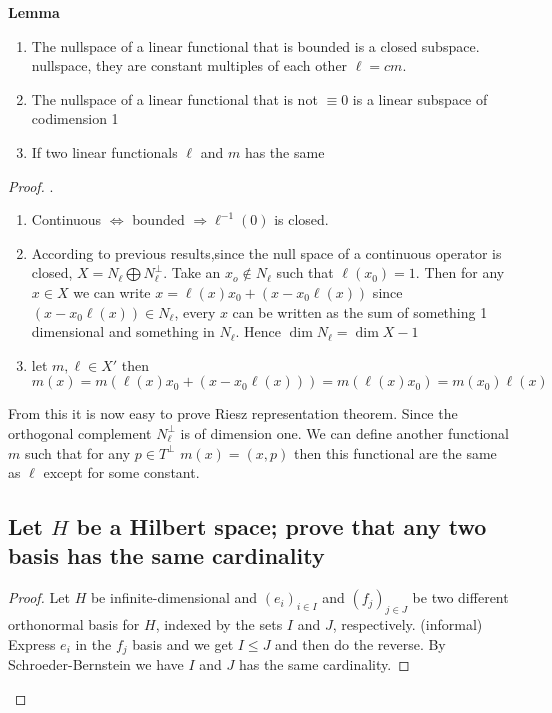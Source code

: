 \documentclass[titlepage]{article}
\begin{document}
\textbf{Lemma}
\begin{enumerate}
\item The nullspace of a linear functional that is bounded is a closed subspace.
nullspace, they are constant multiples of each other $\ell = cm$.
\item The nullspace of a linear functional that is not $\equiv 0$ is a linear subspace of codimension 1
\item If two linear functionals $\ell$ and $m$ has the same 
\end{enumerate}
\begin{proof}
.

\begin{enumerate}
\item  Continuous $\Longleftrightarrow$ bounded $\Longrightarrow \ell ^{-1}(0)$ is closed.
\item According to previous results,since the null space of a continuous operator is closed, $X = N_\ell\bigoplus N_\ell^\perp$.
Take an $x_o\not\in N_\ell$ such that $\ell(x_0) = 1$.
Then for any $x\in X$ we can write $x = \ell(x)x_0 + \left(x - x_0\ell(x)\right)$
since $\left(x - x_0\ell(x)\right) \in  N_\ell$, every $x$ can be written as the sum of something 1 dimensional and something in $N_\ell$. Hence $\dim N_\ell = \dim X - 1$ 
 
\item let $m,\ell \in X'$ then $m(x) = m\left(\ell(x)x_0 + \left(x - x_0\ell(x)\right)\right) = m(\ell(x)x_0) = m(x_0)\ell(x)$


\end{enumerate}
From this it is now easy to prove Riesz representation theorem.
Since the orthogonal complement $N_\ell^\perp$ is of dimension one. We can define another functional $m$ such that for any  $p \in T^\perp$ $m(x) = (x,p)$ then this functional are the same as $\ell$ except for some constant.

\subsection{Let $H$ be a Hilbert space; prove that any two basis has the same cardinality}
\begin{proof}
Let $H$ be infinite-dimensional and $(e_i)_{i\in I}$ and $(f_j)_{j\in J}$ be two different orthonormal basis for $H$, indexed by the sets $I$ and $J$, respectively.
(informal) Express $e_i$ in the $f_j$ basis and we get $I \leq J$ and then do the reverse. By Schroeder-Bernstein we have $I$ and $J$ has the same cardinality.
\end{proof}


\end{proof}
\end{document}
